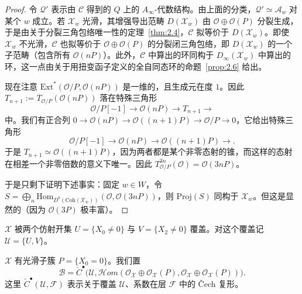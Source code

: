 
\begin{proof}
令 $\mathcal{Q}'$ 表示由 $\mathcal{C}$ 得到的 $Q$ 上的 $A_\infty$-代数结构。由上面的分类，$\mathcal{Q}'\simeq\mathcal{A}_w$ 对某个 $w$ 成立。若 $\mathcal{X}_w$ 光滑，其增强导出范畴 $D(\mathcal{X}_w)$ 由 $\mathcal{O}\oplus\mathcal{O}(P)$ 分裂生成，于是由关于分裂三角包络唯一性的定理~\ref{thm:2.4}，$\mathcal{C}$ 拟等价于 $D(\mathcal{X}_w)$。即使 $\mathcal{X}_w$ 不光滑，$\mathcal{C}$ 也拟等价于 $\mathcal{O}\oplus\mathcal{O}(P)$ 的分裂闭三角包络，即 $D(\mathcal{X}_w)$ 的一个子范畴（包含所有 $\mathcal{O}(nP)$）。此外，$\mathcal{C}$ 中算出的环同构于 $D_\infty(\mathcal{X}_w)$ 中算出的环，这一点由关于用扭变函子定义的全自同态环的命题~\ref{prop:2.6} 给出。

现在注意 $\mathrm{Ext}^*(\mathcal{O}/P,\mathcal{O}(nP))$ 是一维的，且生成元在度 $1$。因此 $T_{n+1}:=T_{\mathcal{O}/P}(\mathcal{O}(nP))$ 落在特殊三角形
\[
\mathcal{O}/P[-1]\to\mathcal{O}(nP)\to T_{n+1}\to
\]
中。我们有正合列 $0\to\mathcal{O}(nP)\to\mathcal{O}((n+1)P)\to\mathcal{O}/P\to0$，它给出特殊三角形
\[
\mathcal{O}/P[-1]\to\mathcal{O}(nP)\to\mathcal{O}((n+1)P)\to.
\]
于是 $T_{n+1}\simeq\mathcal{O}((n+1)P)$，因为两者都是某个非零态射的锥，而这样的态射在相差一个非零倍数的意义下唯一。因此 $T_{\mathcal{O}/P}^{3n}(\mathcal{O})=\mathcal{O}(3nP)$。

于是只剩下证明下述事实：固定 $w\in W$，令 $S=\bigoplus_n\mathrm{Hom}_{D^b(\mathrm{Coh}(\mathcal{X}_w))}(\mathcal{O},\mathcal{O}(3nP))$，则 $\mathrm{Proj}(S)$ 同构于 $\mathcal{X}_w$。但这是显然的（因为 $\mathcal{O}(3P)$ 极丰富）。
\end{proof}


$\mathcal{X}$ 被两个仿射开集 $U=\{X_0\neq0\}$ 与 $V=\{X_2\neq0\}$ 覆盖。对这个覆盖记 $\mathcal{U}=\{U,V\}$。

$\mathcal{X}$ 有光滑子簇 $P=\{X_0=0\}$。我们置
\[
\mathcal{B}=\check{C}^\bullet\bigl(\mathcal{U},\mathcal{H}om(\mathcal{O}_{\mathcal{X}}\oplus\mathcal{O}_{\mathcal{X}}(P),\mathcal{O}_{\mathcal{X}}\oplus\mathcal{O}_{\mathcal{X}}(P))\bigr).
\]
这里 $\check{C}^\bullet(\mathcal{U},\mathcal{F})$ 表示关于覆盖 $\mathcal{U}$、系数在层 $\mathcal{F}$ 中的 Čech 复形。

